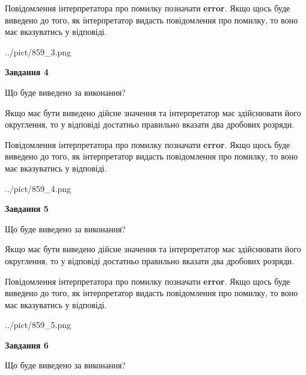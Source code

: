 \documentclass[12pt, ukrainian]{article}
\begin{document}
{\begin {Large}
Повідомлення інтерпретатора про помилку позначати \textbf{error}.
Якщо щось буде виведено до того, як інтерпретатор видасть повідомлення про помилку, 
то воно має вказуватись у відповіді. \par

\begin{center}
	{../pict/859_3.png}
\end{center}
\newpage

{\begin {center}\textbf{Завдання 4}\end {center}}\par
Що буде виведено за виконання? \par

Якщо має бути виведено дійсне значення та інтерпретатор має здійснювати його округлення, 
то у відповіді достатньо правильно вказати два дробових розряди.

Повідомлення інтерпретатора про помилку позначати \textbf{error}.
Якщо щось буде виведено до того, як інтерпретатор видасть повідомлення про помилку, 
то воно має вказуватись у відповіді. \par

\begin{center}
	{../pict/859_4.png}
\end{center}
\newpage

{\begin {center}\textbf{Завдання 5}\end {center}}\par
Що буде виведено за виконання? \par

Якщо має бути виведено дійсне значення та інтерпретатор має здійснювати його округлення, 
то у відповіді достатньо правильно вказати два дробових розряди.

Повідомлення інтерпретатора про помилку позначати \textbf{error}.
Якщо щось буде виведено до того, як інтерпретатор видасть повідомлення про помилку, 
то воно має вказуватись у відповіді. \par

\begin{center}
	{../pict/859_5.png}
\end{center}
\newpage

{\begin {center}\textbf{Завдання 6}\end {center}}\par
Що буде виведено за виконання? \par


\end{Large}}
\end{document}

